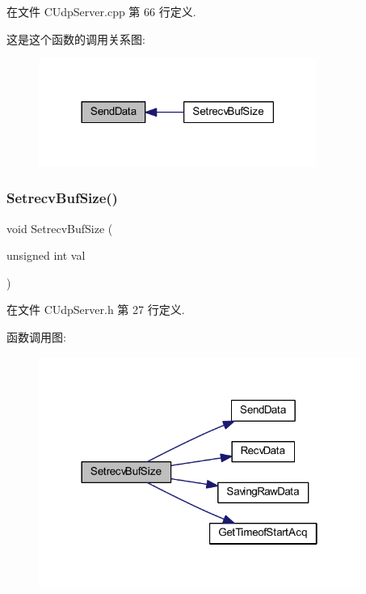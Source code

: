 在文件 C\+Udp\+Server.\+cpp 第 66 行定义.

这是这个函数的调用关系图\+:\nopagebreak
\begin{figure}[H]
\begin{center}
\leavevmode
\includegraphics[width=258pt]{class_c_udp_server_a7372271e50c6806763777245c6a0a2b8_icgraph}
\end{center}
\end{figure}
\mbox{\label{class_c_udp_server_ad3678f42d43bec018b78eab515d572d2}} 
\subsubsection{\texorpdfstring{Setrecv\+Buf\+Size()}{SetrecvBufSize()}}
{\footnotesize\ttfamily void Setrecv\+Buf\+Size (\begin{DoxyParamCaption}\item[{unsigned int}]{val }\end{DoxyParamCaption})\hspace{0.3cm}{\ttfamily [inline]}}



在文件 C\+Udp\+Server.\+h 第 27 行定义.

函数调用图\+:\nopagebreak
\begin{figure}[H]
\begin{center}
\leavevmode
\includegraphics[width=298pt]{class_c_udp_server_ad3678f42d43bec018b78eab515d572d2_cgraph}
\end{center}
\end{figure}


